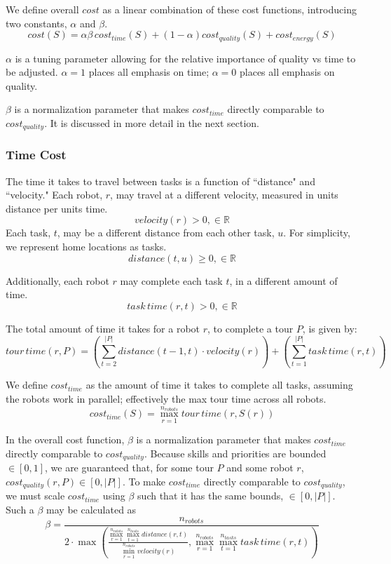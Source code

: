 \documentclass[a4paper]{article}
\begin{document}
We define overall $\mathit{cost}$ as a linear combination of these cost functions, introducing two constants, $\alpha$ and $\beta$.
$$
\mathit{cost}(S) =
  \alpha \beta \, \mathit{cost}_\mathit{time}(S) +
  (1-\alpha) \mathit{cost}_\mathit{quality}(S) +
  \mathit{cost}_\mathit{energy}(S)
$$

$\alpha$ is a tuning parameter allowing for the relative importance of quality vs time to be adjusted. $\alpha = 1$ places all emphasis on time; $\alpha = 0$ places all emphasis on quality.

$\beta$ is a normalization parameter that makes $\mathit{cost}_\mathit{time}$ directly comparable to $\mathit{cost}_\mathit{quality}$. It is discussed in more detail in the next section.

\subsubsection{Time Cost}

The time it takes to travel between tasks is a function of ``distance" and ``velocity." Each robot, $r$, may travel at a different velocity, measured in units distance per units time.
$$\mathit{velocity}(r) > 0, \in \mathbb{R}$$
Each task, $t$, may be a different distance from each other task, $u$. For simplicity, we represent home locations as tasks.
$$\mathit{distance}(t, u) \ge 0, \in \mathbb{R}$$

Additionally, each robot $r$ may complete each task $t$, in a different amount of time.
$$\mathit{task \, time}(r, t) > 0, \in \mathbb{R}$$

The total amount of time it takes for a robot $r$, to complete a tour $P$, is given by:
$$
\mathit{tour \, time}(r, P) =
  \left(
    \sum^{|P|}_{t=2} \mathit{distance}(t - 1, t) \cdot \mathit{velocity}(r)
  \right) +
  \left(
    \sum^{|P|}_{t=1} \mathit{task \, time}(r, t)
  \right)
$$

We define $\mathit{cost}_\mathit{time}$ as the amount of time it takes to complete all tasks, assuming the robots work in parallel; effectively the max tour time across all robots.
$$
\mathit{cost}_\mathit{time}(S) =
  \max_{r=1}^{n_\mathit{robots}}
  \mathit{tour \, time}(r, S(r))
$$

In the overall cost function, $\beta$ is a normalization parameter that makes $\mathit{cost}_\mathit{time}$ directly comparable to $\mathit{cost}_\mathit{quality}$. Because skills and priorities are bounded $\in [0, 1]$, we are guaranteed that, for some tour $P$ and some robot $r$, $\mathit{cost}_\mathit{quality}(r, P) \in [0, |P|]$. To make $\mathit{cost}_\mathit{time}$ directly comparable to $\mathit{cost}_\mathit{quality}$, we must scale $\mathit{cost}_\mathit{time}$ using $\beta$ such that it has the same bounds, $\in [0, |P|]$. Such a $\beta$ may be calculated as
$$
\beta =
    \frac
      {n_\textit{robots}}
      {
        2 \cdot
        \max \left(
          \frac
            { \max\limits_{r=1}^{n_\mathit{robots}} \max\limits_{t=1}^{n_\mathit{tasks}} \mathit{distance}(r, t) }
            { \min\limits_{r=1}^{n_\mathit{robots}} \mathit{velocity}(r) },
          \max\limits_{r=1}^{n_\mathit{robots}} \max\limits_{t=1}^{n_\mathit{tasks}} \mathit{task \, time}(r, t)
        \right)
      }
$$
\end{document}

